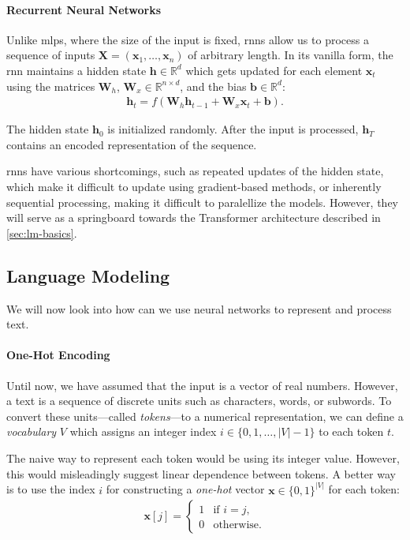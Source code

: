 \paragraph{Recurrent Neural Networks} Unlike \acp{mlp}, where the size of the input is fixed, \acp{rnn} allow us to process a sequence of inputs $\mathbf{X} = (\mathbf{x}_1, \ldots, \mathbf{x}_n)$ of arbitrary length. In its vanilla form, the \ac{rnn} maintains a hidden state $\mathbf{h} \in \mathbb{R}^d$ which gets updated for each element $\mathbf{x}_t$ using the matrices $\mathbf{W}_h$, $\mathbf{W}_x \in \mathbb{R}^{n\times d}$, and the bias $\mathbf{b} \in \mathbb{R}^{d}$:
\begin{align}
    \mathbf{h}_t = f(\mathbf{W}_h \mathbf{h}_{t-1} + \mathbf{W}_x \mathbf{x}_t + \mathbf{b}).
\end{align}

The hidden state $\mathbf{h}_0$ is initialized randomly. After the input is processed, $\mathbf{h}_T$ contains an encoded representation of the sequence.

\acp{rnn} have various shortcomings, such as repeated updates of the hidden state, which make it difficult to update using gradient-based methods, or inherently sequential processing, making it difficult to paralellize the models. However, they will serve as a springboard towards the Transformer architecture described in \autoref{sec:lm-basics}.


\subsection{Language Modeling}
\label{sec:lm-basics}
We will now look into how can we use neural networks to represent and process text.


\paragraph{One-Hot Encoding} Until now, we have assumed that the input is a vector of real numbers. However, a text is a sequence of discrete units such as characters, words, or subwords. To convert these units---called \textit{tokens}---to a numerical representation, we can define a \textit{vocabulary} $V$ which assigns an integer index $i \in \{0, 1, \ldots, |V|-1\}$ to each token $t$.

The naive way to represent each token would be using its integer value. However, this would misleadingly suggest linear dependence between tokens. A better way is to use the index $i$ for constructing a \textit{one-hot} vector $\mathbf{x} \in \{0,1\}^{|V|} $ for each token:
\begin{align}
    \mathbf{x}[j] = \begin{cases}
        1 & \text{if } i = j, \\
        0 & \text{otherwise}.
    \end{cases}
\end{align}


